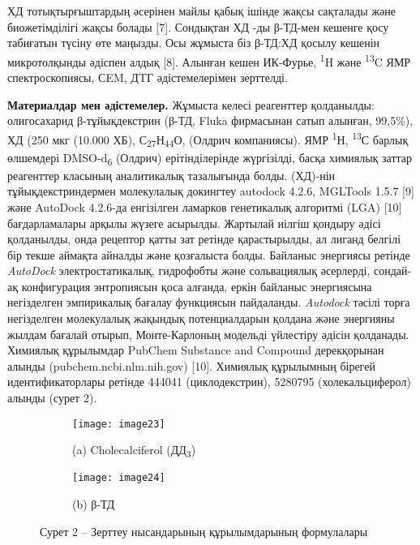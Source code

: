 \begin{multicols}{2}
ХД тотықтырғыштардың әсерінен майлы қабық ішінде жақсы сақталады және
биожетімділігі жақсы болады {[}7{]}. Сондықтан ХД -ды β-ТД-мен кешенге
қосу табиғатын түсіну өте маңызды. Осы жұмыста біз β-ТД:ХД қосылу
кешенін микротолқынды әдіспен алдық {[}8{]}. Алынған кешен ИК-Фурье,
\textsuperscript{1}H және \textsuperscript{13}C ЯМР спектроскопиясы,
СEM, ДTГ әдістемелерімен зерттелді.

{\bfseries Материалдар мен әдістемелер.} Жұмыста келесі реагенттер
қолданылды: олигосахарид β-тұйықдекстрин (β-ТД, Fluka фирмасынан сатып
алынған, 99,5\%), ХД (250 мкг (10.000 ХБ),
С\textsubscript{27}Н\textsubscript{44}О, (Олдрич компаниясы). ЯМР
\textsuperscript{1}Н, \textsuperscript{13}С барлық өлшемдері
DMSO-d\textsubscript{6} (Олдрич) ерітінділерінде жүргізілді, басқа
химиялық заттар реагенттер класының аналитикалық тазалығында болды.
(ХД)-нін тұйықдекстриндермен молекулалық докингтеу autodock 4.2.6,
MGLTools 1.5.7 {[}9{]} және AutoDock 4.2.6-да енгізілген ламарков
генетикалық алгоритмі (LGA) {[}10{]} бағдарламалары арқылы жүзеге
асырылды. Жартылай иілгіш қондыру әдісі қолданылды, онда рецептор қатты
зат ретінде қарастырылды, ал лиганд белгілі бір текше аймақта айналды
және қозғалыста болды. Байланыс энергиясы ретінде \emph{AutoDock}
электростатикалық, гидрофобты және сольвациялық әсерлерді, сондай-ақ
конфигурация энтропиясын қоса алғанда, еркін байланыс энергиясына
негізделген эмпирикалық бағалау функциясын пайдаланды. \emph{Autodock}
тәсілі торға негізделген молекулалық жақындық потенциалдарын қолдана
және энергияны жылдам бағалай отырып, Монте-Карлоның модельді үйлестіру
әдісін қолданады. Химиялық құрылымдар PubChem Substance and Compound
дерекқорынан алынды (pubchem.ncbi.nlm.nih.gov) {[}10{]}. Химиялық
құрылымның бірегей идентификаторлары ретінде 444041 (циклодекстрин),
5280795 (холекальциферол) алынды (сурет 2).
\end{multicols}

\begin{figure}[H]
  \centering
  \begin{subfigure}[b]{0.4\textwidth}
    \centering
    \texttt{[image: image23]}
    \caption*{(a) Cholecalciferol (ДД\textsubscript{3})}
  \end{subfigure}
  \hfill
  \begin{subfigure}[b]{0.4\textwidth}
    \centering
    \texttt{[image: image24]}
    \caption*{(b) β-ТД}
  \end{subfigure}
  \caption*{Сурет 2 -- Зерттеу нысандарының құрылымдарының формулалары}
\end{figure}

